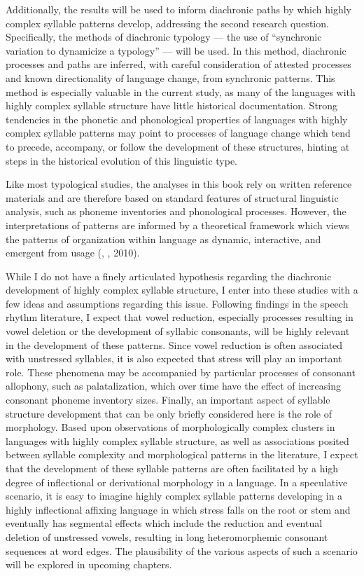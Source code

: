   Additionally, the results will be used to inform diachronic paths by which highly complex syllable patterns develop, addressing the second research question. Specifically, the methods of diachronic typology — the use of “synchronic variation to dynamicize a typology” \citep[272]{Croft2003} — will be used. In this method, diachronic processes and paths are inferred, with careful consideration of attested processes and known directionality of language change, from synchronic patterns. This method is especially valuable in the current study, as many of the languages with highly complex syllable structure have little historical documentation. Strong tendencies in the phonetic and phonological properties of languages with highly complex syllable patterns may point to processes of language change which tend to precede, accompany, or follow the development of these structures, hinting at steps in the historical evolution of this linguistic type.

  Like most typological studies, the analyses in this book rely on written reference materials and are therefore based on standard features of structural linguistic analysis, such as phoneme inventories and phonological processes. However, the interpretations of patterns are informed by a theoretical framework which views the patterns of organization within language as dynamic, interactive, and emergent from usage (\citealt{BecknerEtAl2009}, \citealt{Bybee2001}, 2010).

  While I do not have a finely articulated hypothesis regarding the diachronic development of highly complex syllable structure, I enter into these studies with a few ideas and assumptions regarding this issue. Following findings in the speech rhythm literature, I expect that vowel reduction, especially processes resulting in vowel deletion or the development of syllabic consonants, will be highly relevant in the development of these patterns. Since vowel reduction is often associated with unstressed syllables, it is also expected that stress will play an important role. These phenomena may be accompanied by particular processes of consonant allophony, such as palatalization, which over time have the effect of increasing consonant phoneme inventory sizes. Finally, an important aspect of syllable structure development that can be only briefly considered here is the role of morphology. Based upon observations of morphologically complex clusters in languages with highly complex syllable structure, as well as associations posited between syllable complexity and morphological patterns in the literature, I expect that the development of these syllable patterns are often facilitated by a high degree of inflectional or derivational morphology in a language. In a speculative scenario, it is easy to imagine highly complex syllable patterns developing in a highly inflectional affixing language in which stress falls on the root or stem and eventually has segmental effects which include the reduction and eventual deletion of unstressed vowels, resulting in long heteromorphemic consonant sequences at word edges. The plausibility of the various aspects of such a scenario will be explored in upcoming chapters.

